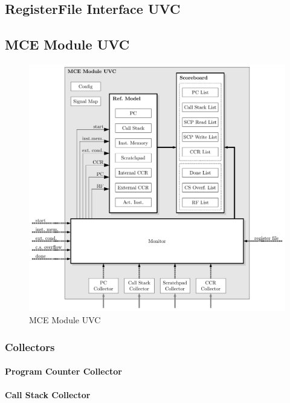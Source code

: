 \subsection{RegisterFile Interface UVC}

\subsection{MCE Module UVC}

\begin{figure}[htb]
 \centering
 \includegraphics[width=1.0\textwidth,angle=0]{images/mce_module_uvc}
 \caption{MCE Module UVC}
\label{fig:module_uvc}
\end{figure}

\subsubsection{Collectors}

\paragraph{Program Counter Collector}

\paragraph{Call Stack Collector}

